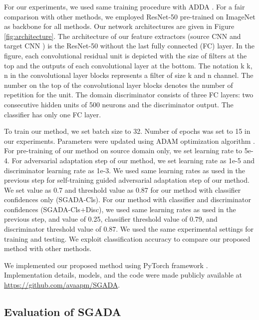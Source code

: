 \documentclass[final]{cvpr}
\begin{document}
For our experiments, we used same training procedure with ADDA \cite{adda}. For a fair comparison with other methods, we employed ResNet-50 \cite{resnet} pre-trained on ImageNet \cite{imagenet_cvpr09} as backbone for all methods. Our network architectures are given in Figure \ref{fig:architecture}. The architecture of our feature extractors (source CNN  and target CNN ) is the ResNet-50 without the last fully connected (FC) layer. In the figure, each convolutional residual unit is depicted with the size of filters at the top and the outputs of each convolutional layer at the bottom. The notation k  k, n in the convolutional layer blocks represents a filter of size k and n channel. The number on the top of the convolutional layer blocks denotes the number of repetition for the unit. The domain discriminator  consists of three FC layers: two consecutive hidden units of 500 neurons and the discriminator output. The classifier  has only one FC layer.
\vspace{2mm}

To train our method, we set batch size to 32. Number of epochs was set to 15 in our experiments. Parameters were updated using ADAM optimization algorithm \cite{adam}. For pre-training of our method on source domain only, we set learning rate to 5e-4. For adversarial adaptation step of our method, we set learning rate as 1e-5 and discriminator learning rate as 1e-3. We used same learning rates as used in the previous step for self-training guided adversarial adaptation step of our method. We set  value as 0.7 and threshold value as 0.87 for our method with classifier confidences only (SGADA-Cls). For our method with classifier and discriminator confidences (SGADA-Cls+Disc), we used same learning rates as used in the previous step, and  value of 0.25, classifier threshold value of 0.79, and discriminator threshold value of 0.87. We used the same experimental settings for training and testing. We exploit classification accuracy to compare our proposed method with other methods.
\vspace{2mm}

We implemented our proposed method using PyTorch framework \cite{pytorch}. Implementation details, models, and the code were made publicly available at \href{https://github.com/avaapm/SGADA}{https://github.com/avaapm/SGADA}.

\subsection{Evaluation of SGADA}
\end{document}
